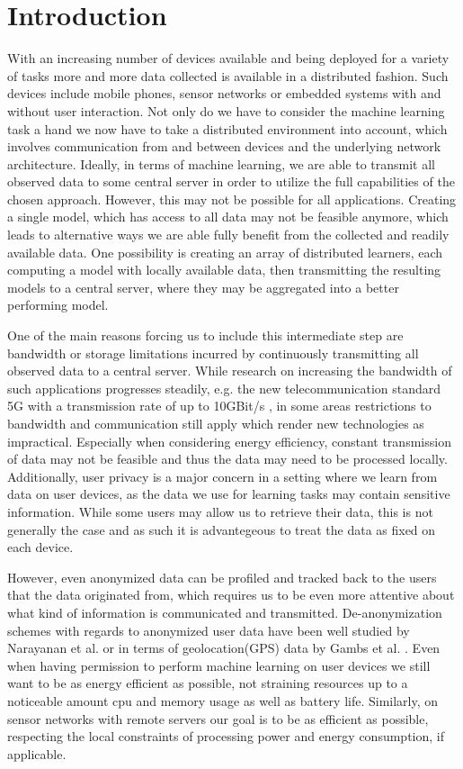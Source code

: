 \chapter{Introduction}
With an increasing number of devices available and being deployed for a variety of tasks more and more data collected is available in a distributed fashion.
Such devices include mobile phones, sensor networks or embedded systems with and without user interaction.
Not only do we have to consider the machine learning task a hand we now have to take a distributed environment into account, which involves communication from and between devices and the underlying  network architecture.
Ideally, in terms of machine learning, we are able to transmit all observed data to some  central server in order to utilize the full capabilities of the chosen approach.
However, this may not be possible for all applications.
Creating a single model, which has access to all data may not be feasible anymore, which leads to alternative ways we are able fully benefit from the collected and readily available data.
One possibility is creating an array of distributed learners, each computing a model with locally available data, then transmitting the resulting models to a central server, where they may be aggregated into a better performing model.

One of the main reasons forcing us to include this intermediate step are bandwidth or storage limitations incurred by continuously transmitting all observed data to a central server.
While research on increasing the bandwidth of such applications progresses steadily, e.g. the new telecommunication standard 5G with a transmission rate of up to 10GBit/s \cite{nordrum2017ieee}, in some areas restrictions to bandwidth and communication still apply which render new technologies as impractical. 
Especially when considering energy efficiency, constant transmission of data may not be feasible and thus the data may need to be processed locally.
Additionally, user privacy is a major concern in a setting where we learn from data on user devices, as the data we use for learning tasks may contain sensitive information.
While some users may allow us to retrieve their data, this is not generally the case and as such it is advantegeous to treat the data as fixed on each device.   

However, even anonymized data can be profiled and tracked back to the users that the data originated from, which requires us to be even more attentive about what kind of information is communicated and transmitted.
De-anonymization schemes with regards to anonymized user data have been well studied  by Narayanan et al. \cite{narayanan2008robust} or in terms of geolocation(GPS) data by Gambs et al. \cite{gambs2014anonymization}.
Even when having permission to perform machine learning on user devices we still want to be as energy efficient as possible, not straining resources up to a noticeable amount \wrt cpu and memory usage as well as battery life.
Similarly, on sensor networks with remote servers our goal is to be as efficient as possible, respecting the local constraints of processing power and energy consumption, if applicable.

